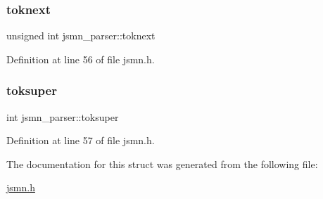 \hypertarget{structjsmn__parser_af640efd7d154218124a964b65f114bff}{}\label{structjsmn__parser_af640efd7d154218124a964b65f114bff} 
\subsubsection{\texorpdfstring{toknext}{toknext}}
{\footnotesize\ttfamily unsigned int jsmn\+\_\+parser\+::toknext}



Definition at line 56 of file jsmn.\+h.

\hypertarget{structjsmn__parser_af11fcec48d9f1298909777a12f1d1e39}{}\label{structjsmn__parser_af11fcec48d9f1298909777a12f1d1e39} 
\subsubsection{\texorpdfstring{toksuper}{toksuper}}
{\footnotesize\ttfamily int jsmn\+\_\+parser\+::toksuper}



Definition at line 57 of file jsmn.\+h.



The documentation for this struct was generated from the following file\+:\begin{DoxyCompactItemize}
\item 
\hyperlink{jsmn_8h}{jsmn.\+h}\end{DoxyCompactItemize}
